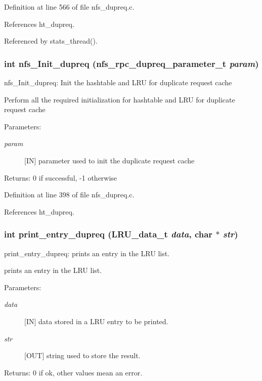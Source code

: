 Definition at line 566 of file nfs\_\-dupreq.c.

References ht\_\-dupreq.

Referenced by stats\_\-thread().
\subsubsection{\setlength{\rightskip}{0pt plus 5cm}int nfs\_\-Init\_\-dupreq (nfs\_\-rpc\_\-dupreq\_\-parameter\_\-t {\em param})}\label{nfs__dupreq_8c_a14}


nfs\_\-Init\_\-dupreq: Init the hashtable and LRU for duplicate request cache

Perform all the required initialization for hashtable and LRU for duplicate request cache

\begin{Desc}
\item[Parameters:]
\begin{description}
\item[{\em param}][IN] parameter used to init the duplicate request cache\end{description}
\end{Desc}
\begin{Desc}
\item[Returns:]0 if successful, -1 otherwise \end{Desc}


Definition at line 398 of file nfs\_\-dupreq.c.

References ht\_\-dupreq.
\subsubsection{\setlength{\rightskip}{0pt plus 5cm}int print\_\-entry\_\-dupreq (LRU\_\-data\_\-t {\em data}, char $\ast$ {\em str})}\label{nfs__dupreq_8c_a8}


print\_\-entry\_\-dupreq: prints an entry in the LRU list.

prints an entry in the LRU list.

\begin{Desc}
\item[Parameters:]
\begin{description}
\item[{\em data}][IN] data stored in a LRU entry to be printed. \item[{\em str}][OUT] string used to store the result.\end{description}
\end{Desc}
\begin{Desc}
\item[Returns:]0 if ok, other values mean an error. \end{Desc}


